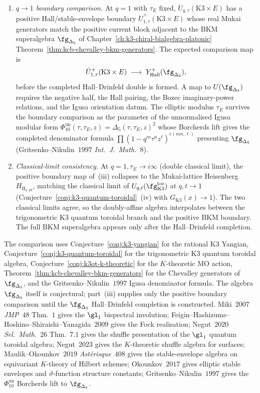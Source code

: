 \begin{conjecture}
\begin{enumerate}[label=\textup{(\roman*)}]
\item \emph{$q \to 1$ boundary comparison.}
At $q = 1$ with $\tau_E$ fixed, $\ddot U_{q, \tau}(\mathrm K3 \times E)$
has a positive Hall/stable-envelope boundary
$\ddot U^+_{1,\tau}(\mathrm K3\times E)$ whose real Mukai generators
match the positive current block adjacent to the BKM superalgebra
$\fg_{\Delta_5}$ of
Chapter~\ref{ch:k3-chiral-bialgebra-platonic}
Theorem~\ref{thm:kcb-chevalley-bkm-generators}. The expected comparison
map is
\[
 \ddot U^+_{1,\tau}(\mathrm K3 \times E)
 \;\longrightarrow\;
 Y^+_{\mathrm{Hall}}(\fg_{\Delta_5}),
\]
before the completed Hall--Drinfeld double is formed. A map to
$U(\fg_{\Delta_5})$ requires the negative half, the Hall pairing, the
Bozec imaginary-power relations, and the Igusa orientation datum. The
elliptic modulus $\tau_E$ survives the boundary comparison as the
parameter of the unnormalised Igusa modular form
\(\Phi_{10}^{\mathrm{un}}(\tau,\tau_E,z)=\Delta_5(\tau,\tau_E,z)^2\)
whose Borcherds
lift gives the completed denominator formula
$\prod(1 - q^m \tau^n z^\ell)^{c(mn, \ell)}$ presenting
$\fg_{\Delta_5}$ (Gritsenko--Nikulin~$1997$
\emph{Int.~J.~Math.}~$8$).

\item \emph{Classical-limit consistency.}
At $q = 1, \tau_E \to i\infty$ (double classical limit), the
positive boundary map of~(iii) collapses to the Mukai-lattice
Heisenberg $H_{\mathrm{II}_{4,20}}$, matching the classical limit of
$U_{q, t}(\fg_{\mathrm K3}^{\mathrm{tor}})$ at $q, t \to 1$
(Conjecture~\ref{conj:k3-quantum-toroidal}~(iv) with
$G_{\mathrm K3}(x) \to 1$). The two classical limits agree, so the
doubly-affine algebra interpolates between the trigonometric K3
quantum toroidal branch and the positive BKM boundary. The full BKM
superalgebra appears only after the Hall--Drinfeld completion.
\end{enumerate}
The comparison uses Conjecture~\ref{conj:k3-yangian} for the rational
K3 Yangian, Conjecture~\ref{conj:k3-quantum-toroidal} for the
trigonometric K3 quantum toroidal algebra,
Conjecture~\ref{conj:k3qt-k-theoretic} for the $K$-theoretic MO action,
Theorem~\ref{thm:kcb-chevalley-bkm-generators} for the Chevalley
generators of $\fg_{\Delta_5}$, and the Gritsenko--Nikulin~$1997$
Igusa denominator formula. The algebra $\fg_{\Delta_5}$ itself is
conjectural; part~\textup{(iii)} supplies only the positive boundary
comparison until the $\fg_{\Delta_5}$ Hall--Drinfeld completion is
constructed. Miki~$2007$ \emph{JMP}~$48$ Thm.~$1$ gives the $\gl_1$
bispectral involution; Feigin--Hashizume--Hoshino--Shiraishi--Yanagida~$2009$
gives the Fock realisation; Negut~$2020$
\emph{Sel.~Math.}~$26$ Thm.~$7.1$ gives the shuffle presentation of the
$\gl_1$ quantum toroidal algebra; Negut~$2023$ gives the $K$-theoretic
shuffle algebra for surfaces; Maulik--Okounkov~$2019$
\emph{Ast\'erisque}~$408$ gives the stable-envelope algebra on
equivariant $K$-theory of Hilbert schemes; Okounkov~$2017$ gives
elliptic stable envelopes and $\vartheta$-function structure constants;
Gritsenko--Nikulin~$1997$ gives the
\(\Phi_{10}^{\mathrm{un}}\) Borcherds lift to $\fg_{\Delta_5}$.
\end{conjecture}

